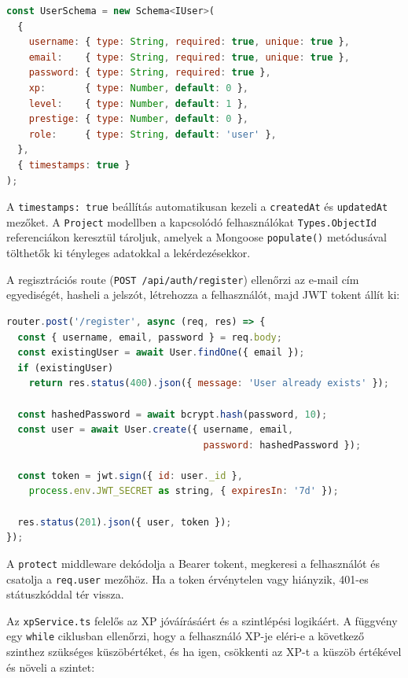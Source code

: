 \begin{lstlisting}[language=JavaScript, caption={User modell (models/User.ts)}]
const UserSchema = new Schema<IUser>(
  {
    username: { type: String, required: true, unique: true },
    email:    { type: String, required: true, unique: true },
    password: { type: String, required: true },
    xp:       { type: Number, default: 0 },
    level:    { type: Number, default: 1 },
    prestige: { type: Number, default: 0 },
    role:     { type: String, default: 'user' },
  },
  { timestamps: true }
);
\end{lstlisting}

A \texttt{timestamps: true} beállítás automatikusan kezeli a \texttt{createdAt} és \texttt{updatedAt} mezőket. A \texttt{Project} modellben a kapcsolódó felhasználókat \texttt{Types.ObjectId} referenciákon keresztül tároljuk, amelyek a Mongoose \texttt{populate()} metódusával tölthetők ki tényleges adatokkal a lekérdezésekkor.


A regisztrációs route (\texttt{POST /api/auth/register}) ellenőrzi az e-mail cím egyediségét, hasheli a jelszót, létrehozza a felhasználót, majd JWT tokent állít ki:

\begin{lstlisting}[language=JavaScript, caption={Regisztrációs végpont (routes/auth.ts)}]
router.post('/register', async (req, res) => {
  const { username, email, password } = req.body;
  const existingUser = await User.findOne({ email });
  if (existingUser)
    return res.status(400).json({ message: 'User already exists' });

  const hashedPassword = await bcrypt.hash(password, 10);
  const user = await User.create({ username, email,
                                   password: hashedPassword });

  const token = jwt.sign({ id: user._id },
    process.env.JWT_SECRET as string, { expiresIn: '7d' });

  res.status(201).json({ user, token });
});
\end{lstlisting}

A \texttt{protect} middleware dekódolja a Bearer tokent, megkeresi a felhasználót és csatolja a \texttt{req.user} mezőhöz. Ha a token érvénytelen vagy hiányzik, 401-es státuszkóddal tér vissza.


Az \texttt{xpService.ts} felelős az XP jóváírásáért és a szintlépési logikáért. A függvény egy \texttt{while} ciklusban ellenőrzi, hogy a felhasználó XP-je eléri-e a következő szinthez szükséges küszöbértéket, és ha igen, csökkenti az XP-t a küszöb értékével és növeli a szintet:

